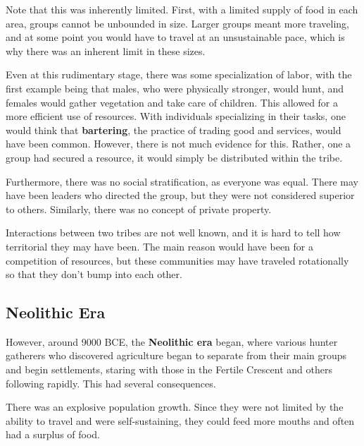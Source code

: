 \documentclass{article}
\begin{document}
    Note that this was inherently limited. First, with a limited supply of food in each area, groups cannot be unbounded in size. Larger groups meant more traveling, and at some point you would have to travel at an unsustainable pace, which is why there was an inherent limit in these sizes. 

    Even at this rudimentary stage, there was some specialization of labor, with the first example being that males, who were physically stronger, would hunt, and females would gather vegetation and take care of children. This allowed for a more efficient use of resources. With individuals specializing in their tasks, one would think that \textbf{bartering}, the practice of trading good and services, would have been common. However, there is not much evidence for this. Rather, one a group had secured a resource, it would simply be distributed within the tribe. 

    Furthermore, there was no social stratification, as everyone was equal. There may have been leaders who directed the group, but they were not considered superior to others. Similarly, there was no concept of private property. 

    Interactions between two tribes are not well known, and it is hard to tell how territorial they may have been. The main reason would have been for a competition of resources, but these communities may have traveled rotationally so that they don't bump into each other. 

  \subsection{Neolithic Era}

    \begin{technology}
      However, around 9000 BCE, the \textbf{Neolithic era} began, where various hunter gatherers who discovered agriculture began to separate from their main groups and begin settlements, staring with those in the Fertile Crescent and others following rapidly. This had several consequences. 
    \end{technology}

    \begin{society}
      There was an explosive population growth. Since they were not limited by the ability to travel and were self-sustaining, they could feed more mouths and often had a surplus of food. 
    \end{society}
\end{document}
